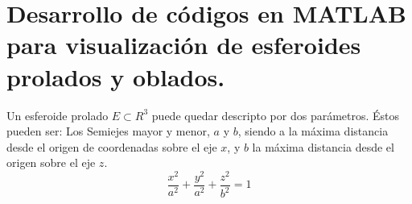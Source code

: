 \appendix
\appendixpage
\addappheadtotoc
\section{Desarrollo de códigos en MATLAB para visualización de esferoides prolados y oblados.}
\label{pendiceA}
Un esferoide prolado $E\subset R^3$  puede quedar descripto por dos parámetros. Éstos pueden ser: 
Los Semiejes mayor y menor, $a$ y $b$, siendo a la máxima distancia desde el origen de coordenadas sobre
el eje $x$, y $b$ la máxima distancia desde el origen sobre el eje $z$. 
\[
\frac{x^2}{a^2} + \frac{y^2}{a^2} + \frac{z^2}{b^2} =1
\]



%
